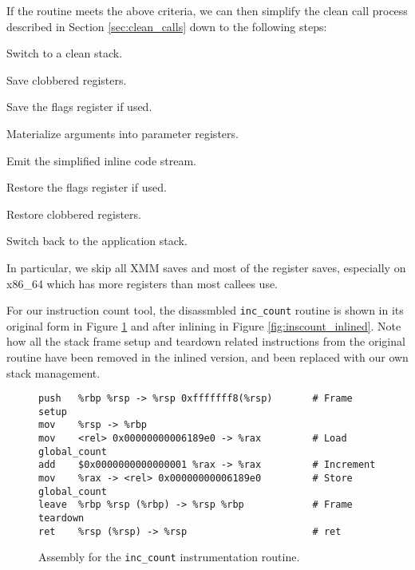 If the routine meets the above criteria, we can then simplify the clean call
process described in Section \ref{sec:clean_calls} down to the following steps:

\begin{packed_enumerate}
\item Switch to a clean stack.
\item Save clobbered registers.
\item Save the flags register if used.
\item Materialize arguments into parameter registers.
\item Emit the simplified inline code stream.
\item Restore the flags register if used.
\item Restore clobbered registers.
\item Switch back to the application stack.
\end{packed_enumerate}

In particular, we skip all XMM saves and most of the register saves, especially
on x86\_64 which has more registers than most callees use.

For our instruction count tool, the disassmbled {\tt inc\_count} routine is
shown in its original form in Figure \ref{fig:inc_count_asm} and after inlining
in Figure \ref{fig:inscount_inlined}.  Note how all the stack frame setup and
teardown related instructions from the original routine have been removed in the
inlined version, and been replaced with our own stack management.

\begin{figure}
\begin{verbatim}
push   %rbp %rsp -> %rsp 0xfffffff8(%rsp)       # Frame setup
mov    %rsp -> %rbp 
mov    <rel> 0x00000000006189e0 -> %rax         # Load global_count
add    $0x0000000000000001 %rax -> %rax         # Increment
mov    %rax -> <rel> 0x00000000006189e0         # Store global_count
leave  %rbp %rsp (%rbp) -> %rsp %rbp            # Frame teardown
ret    %rsp (%rsp) -> %rsp                      # ret
\end{verbatim}
\caption{Assembly for the {\tt inc\_count} instrumentation routine.}
\label{fig:inc_count_asm}
\end{figure}


